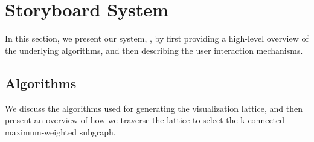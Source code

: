 \section{Storyboard System\label{sec:system}}
In this section, we present our system, \system, by first providing a high-level overview of the underlying algorithms, and then describing the user interaction mechanisms.

\subsection{Algorithms\label{sec:algorithms}}
We discuss the algorithms used for generating the visualization lattice, and then present an overview of how we traverse the lattice to select the k-connected maximum-weighted subgraph.

